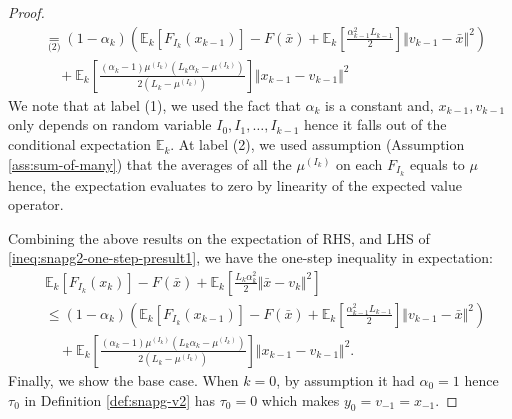 \documentclass[12pt]{article}
\begin{document}
\begin{proof}
{\begin{align*}
                &\underset{\text{(2)}}{=}
                (1 - \alpha_k)\left(
                        \mathbb E_k \left[F_{I_k}(x_{k - 1})\right] 
                        - F(\bar x)
                        + \mathbb E_k \left[\frac{\alpha_{k - 1}^2L_{k - 1}}{2}\right]\Vert v_{k - 1} - \bar x\Vert^2
                \right)
                    \\ &\quad 
                    + \mathbb E_k\left[
                        \frac{(\alpha_k - 1)\mu^{(I_k)}\left(L_k\alpha_k - \mu^{(I_k)}\right)}{2\left(L_k - \mu^{(I_k)}\right)}
                    \right]\Vert x_{k - 1} - v_{k - 1} \Vert^2
            \end{align*}
            }
            We note that at label (1), we used the fact that $\alpha_k$ is a constant and, $x_{k - 1}, v_{k - 1}$ only depends on random variable $I_0, I_1, \ldots, I_{k - 1}$ hence it falls out of the conditional expectation $\mathbb E_k$. 
            At label (2), we used assumption (Assumption \ref{ass:sum-of-many}) that the averages of all the $\mu^{(I_k)}$ on each $F_{I_k}$ equals to $\mu$ hence, the expectation evaluates to zero by linearity of the expected value operator. 
            \par
            Combining the above results on the expectation of RHS, and LHS of \eqref{ineq:snapg2-one-step-presult1}, we have the one-step inequality in expectation: 
            \begin{align*}
                & \mathbb E_k\left[F_{I_k}(x_{k})\right] 
                - F(\bar x) 
                + \mathbb E_k\left[
                    \frac{L_k\alpha_k^2}{2}\Vert \bar x - v_k\Vert^2 
                \right]
                \\
                &\le 
                (1 - \alpha_k)\left(
                        \mathbb E_k \left[F_{I_k}(x_{k - 1})\right] 
                        - F(\bar x)
                        + \mathbb E_k \left[\frac{\alpha_{k - 1}^2L_{k - 1}}{2}\right]\Vert v_{k - 1} - \bar x\Vert^2
                \right)
                    \\ &\quad 
                    + \mathbb E_k\left[
                        \frac{(\alpha_k - 1)\mu^{(I_k)}\left(L_k\alpha_k - \mu^{(I_k)}\right)}{2\left(L_k - \mu^{(I_k)}\right)}
                    \right]\Vert x_{k - 1} - v_{k - 1} \Vert^2. 
            \end{align*}
            Finally, we show the base case. 
            When $k = 0$, by assumption it had $\alpha_0 = 1$ hence $\tau_0$ in Definition \ref{def:snapg-v2} has $\tau_0 = 0$ which makes $y_0 = v_{- 1} = x_{-1}$. 

\end{proof}
\end{document}
